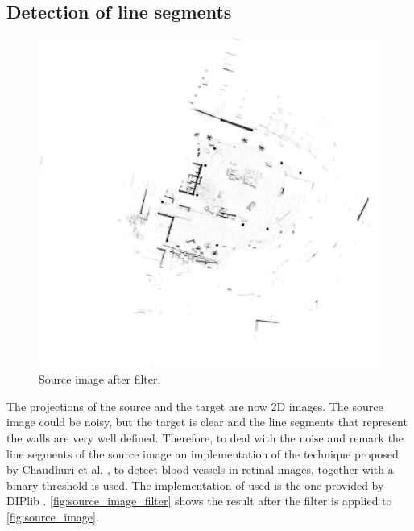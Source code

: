         \subsection{Detection of line segments}
            \begin{figure}[H]
                \includegraphics[width=\textwidth]{images/solution_images/filter_inverted.png}
                \caption{Source image after filter.}
                \label{fig:source_image_filter}
            \end{figure}
        
            The projections of the source and the target are now 2D images. 
            The source image could be noisy, but the target is clear and the line segments that represent the walls are very well defined.
            Therefore, to deal with the noise and remark the line segments of the source image an implementation of the technique proposed 
            by Chaudhuri et al. \cite{Chaudhuri_1989_detection}, to detect blood vessels in retinal images, together with a binary threshold is used. 
            The implementation of \cite{Chaudhuri_1989_detection} used is the one provided by DIPlib \cite{DIPlib_online}.
            \autoref{fig:source_image_filter} shows the result after the filter is applied to \autoref{fig:source_image}.

